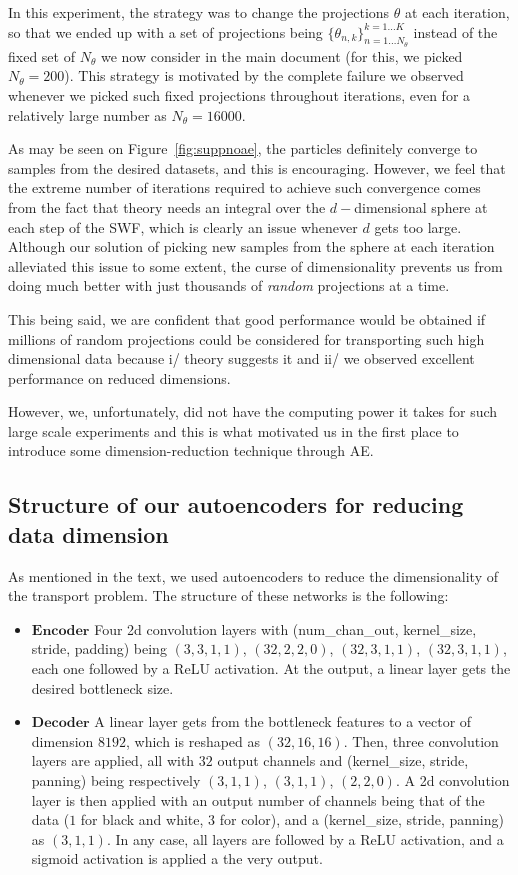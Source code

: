 In this experiment, the strategy was to change the projections $\theta$ at each iteration, so that we ended up with a set of projections being $\{\theta_{n,k}\}_{n=1\dots N_\theta}^{k=1\dots K}$ instead of the fixed set of $N_\theta$ we now consider in the main document (for this, we picked $N_\theta=200$). This strategy is motivated by the complete failure we observed whenever we picked such fixed projections throughout iterations, even for a relatively large number as $N_\theta=16000$.

As may be seen on Figure~\ref{fig:suppnoae}, the particles definitely converge to samples from the desired datasets, and this is encouraging. However, we feel that the extreme number of iterations required to achieve such convergence comes from the fact that theory needs an integral over the $d-$dimensional sphere at each step of the SWF, which is clearly an issue whenever $d$ gets too large.
Although our solution of picking new samples from the sphere at each iteration alleviated this issue to some extent, the curse of dimensionality prevents us from doing much better with just thousands of \emph{random} projections at a time.

This being said, we are confident that good performance would be obtained if millions of random projections could be considered for transporting such high dimensional data because i/ theory suggests it and ii/ we observed excellent performance on reduced dimensions.

However, we, unfortunately, did not have the computing power it takes for such large scale experiments and this is what motivated us in the first place to introduce some dimension-reduction technique through AE.

\subsection{Structure of our autoencoders for reducing data dimension}

As mentioned in the text, we used autoencoders to reduce the dimensionality of the transport problem. The structure of these networks is the following:

\begin{itemize}
  \item $\textbf{Encoder}$ Four 2d convolution layers with (num\_chan\_out, kernel\_size, stride, padding) being $(3,3,1,1)$, $(32,2,2,0)$, $(32,3,1,1)$, $(32, 3,1,1)$, each one followed by a ReLU activation. At the output, a linear layer gets the desired bottleneck size.

  \item $\textbf{Decoder}$ A linear layer gets from the bottleneck features to a vector of dimension $8192$, which is reshaped as $(32, 16,16)$. Then, three convolution layers are applied, all with $32$ output channels and (kernel\_size, stride, panning) being respectively $(3,1,1)$, $(3,1,1)$, $(2,2,0)$. A 2d convolution layer is then applied with an output number of channels being that of the data ($1$ for black and white, $3$ for color), and a (kernel\_size, stride, panning) as $(3,1,1)$. In any case, all layers are followed by a ReLU activation, and a sigmoid activation is applied a the very output.
\end{itemize}

